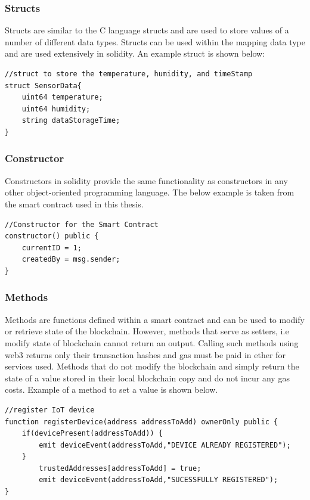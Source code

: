 \documentclass[11pt,openright]{report}
\begin{document}
\subsubsection{Structs}
Structs are similar to the C language structs and are used to store values of a number of different data types. Structs can be used within the mapping data type and are used extensively in solidity. An example struct is shown below:
\begin{lstlisting}
//struct to store the temperature, humidity, and timeStamp
struct SensorData{
    uint64 temperature;
    uint64 humidity;
    string dataStorageTime;
}
\end{lstlisting}

\subsubsection{Constructor}
Constructors in solidity provide the same functionality as constructors in any other object-oriented programming language. The below example is taken from the smart contract used in this thesis.
\begin{lstlisting}
//Constructor for the Smart Contract
constructor() public {
    currentID = 1;
    createdBy = msg.sender;
}
\end{lstlisting}

\subsubsection{Methods}
Methods are functions defined within a smart contract and can be used to modify or retrieve state of the blockchain. However, methods that serve as setters, i.e modify state of blockchain cannot return an output. Calling such methods using web3 returns only their transaction hashes and gas must be paid in ether for services used. Methods that do not modify the blockchain and simply return the state of a value stored in their local blockchain copy and do not incur any gas costs. Example of a method to set a value is shown below.
\begin{lstlisting}
//register IoT device
function registerDevice(address addressToAdd) ownerOnly public {
    if(devicePresent(addressToAdd)) {
        emit deviceEvent(addressToAdd,"DEVICE ALREADY REGISTERED");
    }
        trustedAddresses[addressToAdd] = true;
        emit deviceEvent(addressToAdd,"SUCESSFULLY REGISTERED");
}
\end{lstlisting}
\end{document}
